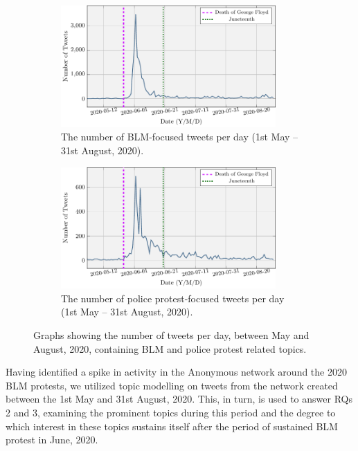 \documentclass[letterpaper]{article}
\begin{document}
\begin{figure}[!ht]
\centering
\begin{subfigure}[b]{0.4\textwidth}
    \centering
    \includegraphics[width=0.9\textwidth]{num_blm_tweets.pdf}
    \caption{The number of BLM-focused tweets per day (1st May -- 31st August, 2020).}
\end{subfigure}
\quad
\begin{subfigure}[b]{0.4\textwidth}
     \centering
     \includegraphics[width=0.9\textwidth]{num_police_tweets.pdf}
     \caption{The number of police protest-focused tweets per day (1st May -- 31st August, 2020).}
\end{subfigure}
\caption{Graphs showing the number of tweets per day, between May and August, 2020, containing BLM and police protest related topics.}
\label{fig:TweetsPerDay}
\end{figure}

Having identified a spike in activity in the Anonymous network around the 2020 BLM protests, we utilized topic modelling on tweets from the network created between the 1st May and 31st August, 2020. This, in turn, is used to answer RQs 2 and 3, examining the prominent topics during this period and the degree to which interest in these topics sustains itself after the period of sustained BLM protest in June, 2020.
\end{document}
